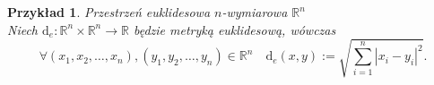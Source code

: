 \documentclass[12pt,a4paper]{report}
\newtheorem{definition}[theorem]{Definicja}
\newtheorem{example}{Przykład}
\begin{document}
\begin{example}{Przestrzeń euklidesowa $n$-wymiarowa $\mathbb{R}^n$}\\
Niech $\mathrm{d}_e: \mathbb{R}^n \times \mathbb{R}^n \rightarrow \mathbb{R}$ będzie metryką euklidesową, wówczas
$$\forall{(x_1,x_2,\ldots,x_n),(y_1,y_2,\ldots,y_n) \in \mathbb{R}^n} \quad \mathrm{d}_e(x,y):= \sqrt{\sum_{i=1}^{n} |x_i-y_i|^2}.$$
\end{example}


%
%
%
%
\end{document}
